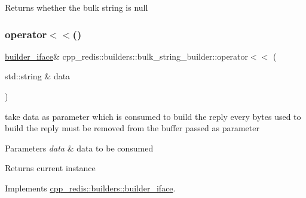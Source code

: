 \begin{DoxyReturn}{Returns}
whether the bulk string is null 
\end{DoxyReturn}
\mbox{\label{classcpp__redis_1_1builders_1_1bulk__string__builder_a43000357f87212f657aafe279a92b541}} 
\subsubsection{\texorpdfstring{operator$<$$<$()}{operator<<()}}
{\footnotesize\ttfamily \hyperlink{classcpp__redis_1_1builders_1_1builder__iface}{builder\+\_\+iface}\& cpp\+\_\+redis\+::builders\+::bulk\+\_\+string\+\_\+builder\+::operator$<$$<$ (\begin{DoxyParamCaption}\item[{std\+::string \&}]{data }\end{DoxyParamCaption})\hspace{0.3cm}{\ttfamily [virtual]}}

take data as parameter which is consumed to build the reply every bytes used to build the reply must be removed from the buffer passed as parameter


\begin{DoxyParams}{Parameters}
{\em data} & data to be consumed \\
\hline
\end{DoxyParams}
\begin{DoxyReturn}{Returns}
current instance 
\end{DoxyReturn}


Implements \hyperlink{classcpp__redis_1_1builders_1_1builder__iface_a9892bbc9c887c31c2742dad4476e2fa6}{cpp\+\_\+redis\+::builders\+::builder\+\_\+iface}.

\mbox{\label{classcpp__redis_1_1builders_1_1bulk__string__builder_a4d80d8dfe305e35aca8b4ec84c56fbea}} 
